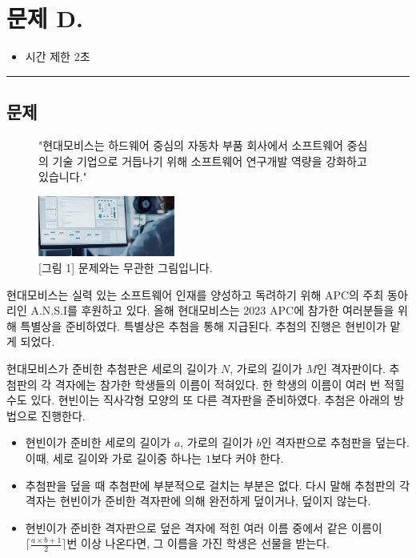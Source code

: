 \newpage
\section*{{\Large 문제 D.} }

\begin{itemize}
    \item 시간 제한 \tabto{2cm} 2초
\end{itemize}

\hrule

\subsection*{문제}

\begin{figure}[h]
    \centering
    \captionsetup{width=0.7\textwidth}
    \caption{\centering "현대모비스는 하드웨어 중심의 자동차 부품 회사에서 소프트웨어 중심의 기술 기업으로 거듭나기 위해 소프트웨어 연구개발 역량을 강화하고 있습니다."}
    
    \includegraphics[width=0.4\textwidth]{problems/image/mobis_lotto.png}
    
    \caption{[그림 1] 문제와는 무관한 그림입니다.}
\end{figure}

현대모비스는 실력 있는 소프트웨어 인재를 양성하고 독려하기 위해 APC의 주최 동아리인 A.N.S.I를 후원하고 있다. 올해 현대모비스는 2023 APC에 참가한 여러분들을 위해 특별상을 준비하였다. 특별상은 추첨을 통해 지급된다. 추첨의 진행은 현빈이가 맡게 되었다.

현대모비스가 준비한 추첨판은 세로의 길이가 $N$, 가로의 길이가 $M$인 격자판이다. 추첨판의 각 격자에는 참가한 학생들의 이름이 적혀있다. 한 학생의 이름이 여러 번 적힐 수도 있다. 현빈이는 직사각형 모양의 또 다른 격자판을 준비하였다. 추첨은 아래의 방법으로 진행한다.

\begin{itemize}
    \item 현빈이가 준비한 세로의 길이가 $a$, 가로의 길이가 $b$인 격자판으로 추첨판을 덮는다. 이때, 세로 길이와 가로 길이중 하나는 $1$보다 커야 한다.
    \item 추첨판을 덮을 때 추첨판에 부분적으로 걸치는 부분은 없다. 다시 말해 추첨판의 각 격자는 현빈이가 준비한 격자판에 의해 완전하게 덮이거나, 덮이지 않는다.
    \item 현빈이가 준비한 격자판으로 덮은 격자에 적힌 여러 이름 중에서 같은 이름이 $\lceil \frac{a\times b+1}{2}\rceil$번 이상 나온다면, 그 이름을 가진 학생은 선물을 받는다.
\end{itemize}

